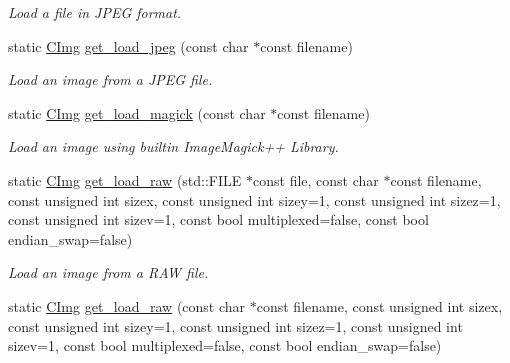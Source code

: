 \begin{DoxyCompactItemize}
\begin{DoxyCompactList}\small\item\em Load a file in JPEG format. \item\end{DoxyCompactList}\item 
\hypertarget{structcimg__library_1_1_c_img_a0face6e46c3e4d1fdb26865f743504eb}{
static \hyperlink{structcimg__library_1_1_c_img}{CImg} \hyperlink{structcimg__library_1_1_c_img_a0face6e46c3e4d1fdb26865f743504eb}{get\_\-load\_\-jpeg} (const char $\ast$const filename)}
\label{structcimg__library_1_1_c_img_a0face6e46c3e4d1fdb26865f743504eb}

\begin{DoxyCompactList}\small\item\em Load an image from a JPEG file. \item\end{DoxyCompactList}\item 
static \hyperlink{structcimg__library_1_1_c_img}{CImg} \hyperlink{structcimg__library_1_1_c_img_a263aadb8d074a96e73f67908853ef501}{get\_\-load\_\-magick} (const char $\ast$const filename)
\begin{DoxyCompactList}\small\item\em Load an image using builtin ImageMagick++ Library. \item\end{DoxyCompactList}\item 
\hypertarget{structcimg__library_1_1_c_img_a980e8f9a7706398cfca97eca26b97a70}{
static \hyperlink{structcimg__library_1_1_c_img}{CImg} \hyperlink{structcimg__library_1_1_c_img_a980e8f9a7706398cfca97eca26b97a70}{get\_\-load\_\-raw} (std::FILE $\ast$const file, const char $\ast$const filename, const unsigned int sizex, const unsigned int sizey=1, const unsigned int sizez=1, const unsigned int sizev=1, const bool multiplexed=false, const bool endian\_\-swap=false)}
\label{structcimg__library_1_1_c_img_a980e8f9a7706398cfca97eca26b97a70}

\begin{DoxyCompactList}\small\item\em Load an image from a RAW file. \item\end{DoxyCompactList}\item 
\hypertarget{structcimg__library_1_1_c_img_a100f650f6012a82cb8818230da99e6e2}{
static \hyperlink{structcimg__library_1_1_c_img}{CImg} \hyperlink{structcimg__library_1_1_c_img_a100f650f6012a82cb8818230da99e6e2}{get\_\-load\_\-raw} (const char $\ast$const filename, const unsigned int sizex, const unsigned int sizey=1, const unsigned int sizez=1, const unsigned int sizev=1, const bool multiplexed=false, const bool endian\_\-swap=false)}
\label{structcimg__library_1_1_c_img_a100f650f6012a82cb8818230da99e6e2}


\end{DoxyCompactItemize}
